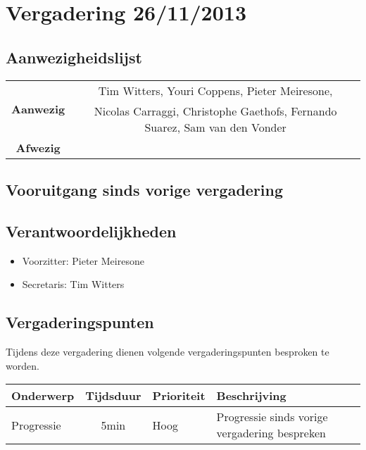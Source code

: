 \section{Vergadering 26/11/2013}
\subsection{Aanwezigheidslijst}
\begin{table}[htbp]
	\centering
	\begin{tabular}{c|c}
		\multirow{2}{*}{\textbf{Aanwezig}} & Tim Witters, Youri Coppens, Pieter Meiresone, \\
		& Nicolas Carraggi,  Christophe Gaethofs, Fernando Suarez, Sam van den Vonder \\
		\hline
		\textbf{Afwezig} & \\
	\end{tabular}
\end{table}

\subsection{Vooruitgang sinds vorige vergadering}


\subsection{Verantwoordelijkheden}
\begin{itemize}
	\item Voorzitter: Pieter Meiresone
	\item Secretaris: Tim Witters
\end{itemize}
\subsection{Vergaderingspunten}

Tijdens deze vergadering dienen volgende vergaderingspunten besproken te worden.
\begin{table} [H]
	\centering
	\begin{tabular} {l|cll}
		\textbf{Onderwerp} & \textbf{Tijdsduur} & \textbf{Prioriteit} & \textbf{Beschrijving} \\ %
		\hline
		Progressie & 5min & Hoog & Progressie sinds vorige vergadering bespreken \\

	\end{tabular}
\end{table}

